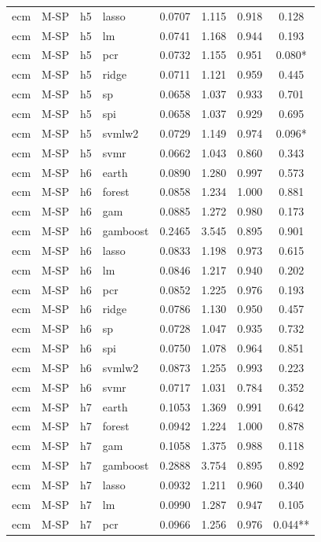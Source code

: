 \begin{ThreePartTable}
\begin{longtable}[t]{llclcccc}
ecm & M-SP & h5 & lasso & 0.0707 & 1.115 & 0.918 & 0.128\\
ecm & M-SP & h5 & lm & 0.0741 & 1.168 & 0.944 & 0.193\\
ecm & M-SP & h5 & pcr & 0.0732 & 1.155 & 0.951 & 0.080*\\
ecm & M-SP & h5 & ridge & 0.0711 & 1.121 & 0.959 & 0.445\\
ecm & M-SP & h5 & sp & 0.0658 & 1.037 & 0.933 & 0.701\\
ecm & M-SP & h5 & spi & 0.0658 & 1.037 & 0.929 & 0.695\\
ecm & M-SP & h5 & svmlw2 & 0.0729 & 1.149 & 0.974 & 0.096*\\
ecm & M-SP & h5 & svmr & 0.0662 & 1.043 & 0.860 & 0.343\\
\addlinespace
ecm & M-SP & h6 & earth & 0.0890 & 1.280 & 0.997 & 0.573\\
ecm & M-SP & h6 & forest & 0.0858 & 1.234 & 1.000 & 0.881\\
ecm & M-SP & h6 & gam & 0.0885 & 1.272 & 0.980 & 0.173\\
ecm & M-SP & h6 & gamboost & 0.2465 & 3.545 & 0.895 & 0.901\\
ecm & M-SP & h6 & lasso & 0.0833 & 1.198 & 0.973 & 0.615\\
ecm & M-SP & h6 & lm & 0.0846 & 1.217 & 0.940 & 0.202\\
ecm & M-SP & h6 & pcr & 0.0852 & 1.225 & 0.976 & 0.193\\
ecm & M-SP & h6 & ridge & 0.0786 & 1.130 & 0.950 & 0.457\\
ecm & M-SP & h6 & sp & 0.0728 & 1.047 & 0.935 & 0.732\\
ecm & M-SP & h6 & spi & 0.0750 & 1.078 & 0.964 & 0.851\\
ecm & M-SP & h6 & svmlw2 & 0.0873 & 1.255 & 0.993 & 0.223\\
ecm & M-SP & h6 & svmr & 0.0717 & 1.031 & 0.784 & 0.352\\
\addlinespace
ecm & M-SP & h7 & earth & 0.1053 & 1.369 & 0.991 & 0.642\\
ecm & M-SP & h7 & forest & 0.0942 & 1.224 & 1.000 & 0.878\\
ecm & M-SP & h7 & gam & 0.1058 & 1.375 & 0.988 & 0.118\\
ecm & M-SP & h7 & gamboost & 0.2888 & 3.754 & 0.895 & 0.892\\
ecm & M-SP & h7 & lasso & 0.0932 & 1.211 & 0.960 & 0.340\\
ecm & M-SP & h7 & lm & 0.0990 & 1.287 & 0.947 & 0.105\\
ecm & M-SP & h7 & pcr & 0.0966 & 1.256 & 0.976 & 0.044**\\

\end{longtable}
\end{ThreePartTable}
